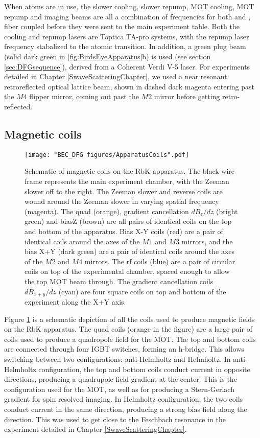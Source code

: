 When \K{} atoms are in use, the slower cooling, slower repump, MOT cooling, MOT repump and imaging beams are all a combination of frequencies for both \Rb{} and \K{}, fiber coupled before they were sent to the main experiment table. Both the \K{} cooling and repump lasers are Toptica TA-pro systems, with the repump laser frequency stabalized to the \K{} atomic transition. In addition, a green plug beam (solid dark green in \ref{fig:BirdsEyeApparatus}b) is used (see section \ref{sec:DFGsequence}), derived from a Coherent Verdi V-5 laser. For \K{} experiments detailed in Chapter \ref{SwaveScatteringChapter}, we used a near resonant retroreflected optical lattice beam, shown in dashed dark magenta entering past the $M4$ flipper mirror, coming out past the $M2$ mirror before getting retro-reflected.

\subsection{Magnetic coils}\label{sec:magneticCoils}
\begin{figure}
	\texttt{[image: "BEC\_DFG figures/ApparatusCoils".pdf]}
\caption[Schematic of magnetic coils on the RbK apparatus]{Schematic of magnetic coils on the RbK apparatus. The black wire frame represents the main experiment chamber, with the Zeeman slower off to the right. The Zeeman slower and reverse coils are wound around the Zeeman slower in varying spatial frequency (magenta). The quad (orange), gradient cancellation $dB_z/dz$ (bright green) and biasZ (brown) are all pairs of identical coils on the top and bottom of the apparatus. Bias X-Y coils (red) are a pair of identical coils around the axes of the $M1$ and $M3$ mirrors, and the bias X+Y (dark green) are a pair of identical coils around the axes of the $M2$ and $M4$ mirrors. The rf coils (blue) are a pair of circular coils on top of the experimental chamber, spaced enough to allow the top MOT beam through. The gradient cancellation coils $dB_{x+y}/dz$ (cyan) are four square coils on top and bottom of the experiment along the X+Y axis. }
\label{fig:ApparatusCoils}
\end{figure}

Figure \ref{fig:ApparatusCoils} is a schematic depiction of all the coils used to produce magnetic fields on the RbK apparatus. The quad coils (orange in the figure) are a large pair of coils used to produce a quadropole field for the MOT. The top and bottom coils are connected through four IGBT switches, forming an h-bridge. This allows switching between two configurations: anti-Helmholtz and Helmholtz. In anti-Helmholtz configuration, the top and bottom coils conduct current in opposite directions, producing a quadrupole field gradient at the center. This is the configuration used for the MOT, as well as for producing a Stern-Gerlach gradient for spin resolved imaging. In Helmholtz configuration, the two coils conduct current in the same direction, producing a strong bias field along the \ez{} direction. This was used to get close to the Feschbach resonance in the experiment detailed in Chapter \ref{SwaveScatteringChapter}. 

